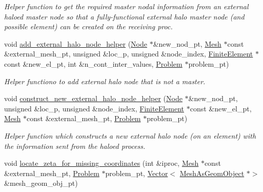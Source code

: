\begin{DoxyCompactItemize}
\begin{DoxyCompactList}\small\item\em Helper function to get the required master nodal information from an external haloed master node so that a fully-\/functional external halo master node (and possible element) can be created on the receiving proc. \end{DoxyCompactList}\item 
void \hyperlink{namespaceoomph_1_1Multi__domain__functions_abbec3c28e0cdbe77c6ce3c9021528247}{add\+\_\+external\+\_\+halo\+\_\+node\+\_\+helper} (\hyperlink{classoomph_1_1Node}{Node} $\ast$\&new\+\_\+nod\+\_\+pt, \hyperlink{classoomph_1_1Mesh}{Mesh} $\ast$const \&external\+\_\+mesh\+\_\+pt, unsigned \&loc\+\_\+p, unsigned \&node\+\_\+index, \hyperlink{classoomph_1_1FiniteElement}{Finite\+Element} $\ast$const \&new\+\_\+el\+\_\+pt, int \&n\+\_\+cont\+\_\+inter\+\_\+values, \hyperlink{classoomph_1_1Problem}{Problem} $\ast$problem\+\_\+pt)
\begin{DoxyCompactList}\small\item\em Helper functiono to add external halo node that is not a master. \end{DoxyCompactList}\item 
void \hyperlink{namespaceoomph_1_1Multi__domain__functions_aa0a1707ca80a12f948616e016a1ed191}{construct\+\_\+new\+\_\+external\+\_\+halo\+\_\+node\+\_\+helper} (\hyperlink{classoomph_1_1Node}{Node} $\ast$\&new\+\_\+nod\+\_\+pt, unsigned \&loc\+\_\+p, unsigned \&node\+\_\+index, \hyperlink{classoomph_1_1FiniteElement}{Finite\+Element} $\ast$const \&new\+\_\+el\+\_\+pt, \hyperlink{classoomph_1_1Mesh}{Mesh} $\ast$const \&external\+\_\+mesh\+\_\+pt, \hyperlink{classoomph_1_1Problem}{Problem} $\ast$problem\+\_\+pt)
\begin{DoxyCompactList}\small\item\em Helper function which constructs a new external halo node (on an element) with the information sent from the haloed process. \end{DoxyCompactList}\item 
void \hyperlink{namespaceoomph_1_1Multi__domain__functions_a2fee5918eeeaf87be5e996abb26c2dc1}{locate\+\_\+zeta\+\_\+for\+\_\+missing\+\_\+coordinates} (int \&iproc, \hyperlink{classoomph_1_1Mesh}{Mesh} $\ast$const \&external\+\_\+mesh\+\_\+pt, \hyperlink{classoomph_1_1Problem}{Problem} $\ast$problem\+\_\+pt, \hyperlink{classoomph_1_1Vector}{Vector}$<$ \hyperlink{classoomph_1_1MeshAsGeomObject}{Mesh\+As\+Geom\+Object} $\ast$$>$ \&mesh\+\_\+geom\+\_\+obj\+\_\+pt)
$$
\end{DoxyCompactItemize}
